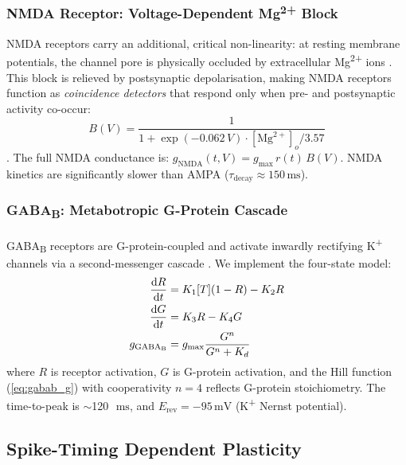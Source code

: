 \documentclass[11pt, a4paper, twocolumn]{article}
\newcommand{\mV}{\ensuremath{\,\mathrm{mV}}}
\newcommand{\ms}{\ensuremath{\,\mathrm{ms}}}
\begin{document}
\subsubsection{NMDA Receptor: Voltage-Dependent Mg\textsuperscript{2+} Block}

NMDA receptors carry an additional, critical non-linearity: at resting
membrane potentials, the channel pore is physically occluded by
extracellular Mg\textsuperscript{2+} ions \citep{Nowak1984}. This block is
relieved by postsynaptic depolarisation, making NMDA receptors function as
\emph{coincidence detectors} that respond only when pre- and postsynaptic
activity co-occur:
\begin{equation}
  B(V) = \frac{1}{1 + \exp(-0.062\,V) \cdot [\mathrm{Mg}^{2+}]_o / 3.57}
  \label{eq:mg_block}
\end{equation}
\citep{Jahr1990}. The full NMDA conductance is:
$g_{\mathrm{NMDA}}(t,V) = g_{\max}\,r(t)\,B(V)$.
NMDA kinetics are significantly slower than AMPA ($\tau_{\mathrm{decay}} \approx 150\ms$).

\subsubsection{GABA\textsubscript{B}: Metabotropic G-Protein Cascade}

GABA\textsubscript{B} receptors are G-protein-coupled and activate inwardly
rectifying K\textsuperscript{+} channels via a second-messenger cascade
\citep{Destexhe1994}. We implement the four-state model:
\begin{align}
  \dv{R}{t} &= K_1[T](1-R) - K_2 R \label{eq:gabab_R}\\
  \dv{G}{t} &= K_3 R - K_4 G \label{eq:gabab_G}\\
  g_{\mathrm{GABA_B}} &= g_{\max} \frac{G^n}{G^n + K_d} \label{eq:gabab_g}
\end{align}
where $R$ is receptor activation, $G$ is G-protein activation, and the
Hill function (\cref{eq:gabab_g}) with cooperativity $n = 4$ reflects
G-protein stoichiometry. The time-to-peak is $\sim$\SI{120}{\ms}, and
$E_{\mathrm{rev}} = -95\mV$ (K\textsuperscript{+} Nernst potential).

\subsection{Spike-Timing Dependent Plasticity}
\label{sec:stdp}
\end{document}
